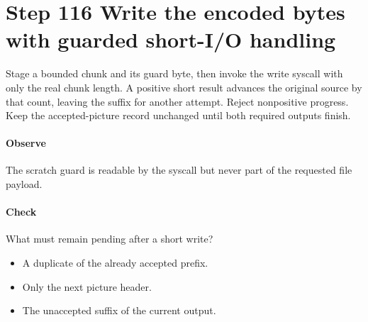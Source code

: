 \section{Step 116 Write the encoded bytes with guarded short-I/O handling}\label{h263-clip-s06}
Stage a bounded chunk and its guard byte, then invoke the write syscall with only
the real chunk length. A positive short result advances the original source by
that count, leaving the suffix for another attempt. Reject nonpositive progress.
Keep the accepted-picture record unchanged until both required outputs finish.

\paragraph{Observe} The scratch guard is readable by the syscall but never part of the requested file payload.
\paragraph{Check} What must remain pending after a short write?
\begin{itemize}
  \item[A.] A duplicate of the already accepted prefix.
  \item[B.] Only the next picture header.
  \item[C.] The unaccepted suffix of the current output.
\end{itemize}
